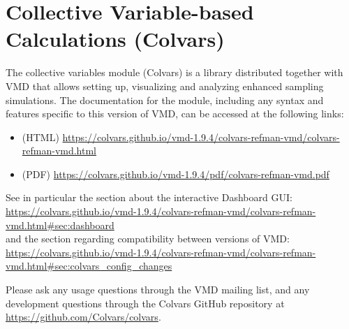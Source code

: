 \section{Collective Variable-based Calculations (Colvars)}
\label{section:colvars}

The collective variables module (Colvars) is a library distributed together with VMD that allows setting up, visualizing and analyzing enhanced sampling simulations.
The documentation for the module, including any syntax and features specific to this version of VMD, can be accessed at the following links:
\begin{itemize}
\item (HTML) \url{https://colvars.github.io/vmd-1.9.4/colvars-refman-vmd/colvars-refman-vmd.html}
\item (PDF) \url{https://colvars.github.io/vmd-1.9.4/pdf/colvars-refman-vmd.pdf}
\end{itemize}
\noindent{}See in particular the section about the interactive Dashboard GUI:\\
\url{https://colvars.github.io/vmd-1.9.4/colvars-refman-vmd/colvars-refman-vmd.html#sec:dashboard}\\
\noindent{}and the section regarding compatibility between versions of VMD:\\
\url{https://colvars.github.io/vmd-1.9.4/colvars-refman-vmd/colvars-refman-vmd.html#sec:colvars_config_changes}
 
Please ask any usage questions through the VMD mailing list, and any development questions through the Colvars GitHub repository at \url{https://github.com/Colvars/colvars}.
